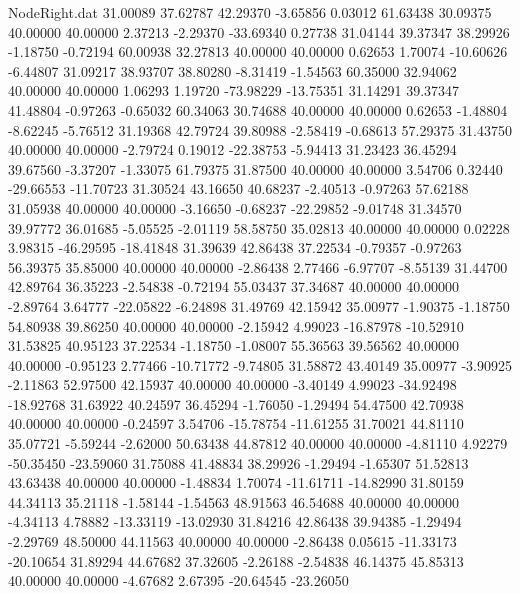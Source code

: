 \begin{filecontents}{NodeRight.dat}
  31.00089   37.62787   42.29370    -3.65856    0.03012   61.63438   30.09375   40.00000   40.00000    2.37213   -2.29370  -33.69340    0.27738
  31.04144   39.37347   38.29926    -1.18750   -0.72194   60.00938   32.27813   40.00000   40.00000    0.62653    1.70074  -10.60626   -6.44807
  31.09217   38.93707   38.80280    -8.31419   -1.54563   60.35000   32.94062   40.00000   40.00000    1.06293    1.19720  -73.98229  -13.75351
  31.14291   39.37347   41.48804    -0.97263   -0.65032   60.34063   30.74688   40.00000   40.00000    0.62653   -1.48804   -8.62245   -5.76512
  31.19368   42.79724   39.80988    -2.58419   -0.68613   57.29375   31.43750   40.00000   40.00000   -2.79724    0.19012  -22.38753   -5.94413
  31.23423   36.45294   39.67560    -3.37207   -1.33075   61.79375   31.87500   40.00000   40.00000    3.54706    0.32440  -29.66553  -11.70723
  31.30524   43.16650   40.68237    -2.40513   -0.97263   57.62188   31.05938   40.00000   40.00000   -3.16650   -0.68237  -22.29852   -9.01748
  31.34570   39.97772   36.01685    -5.05525   -2.01119   58.58750   35.02813   40.00000   40.00000    0.02228    3.98315  -46.29595  -18.41848
  31.39639   42.86438   37.22534    -0.79357   -0.97263   56.39375   35.85000   40.00000   40.00000   -2.86438    2.77466   -6.97707   -8.55139
  31.44700   42.89764   36.35223    -2.54838   -0.72194   55.03437   37.34687   40.00000   40.00000   -2.89764    3.64777  -22.05822   -6.24898
  31.49769   42.15942   35.00977    -1.90375   -1.18750   54.80938   39.86250   40.00000   40.00000   -2.15942    4.99023  -16.87978  -10.52910
  31.53825   40.95123   37.22534    -1.18750   -1.08007   55.36563   39.56562   40.00000   40.00000   -0.95123    2.77466  -10.71772   -9.74805
  31.58872   43.40149   35.00977    -3.90925   -2.11863   52.97500   42.15937   40.00000   40.00000   -3.40149    4.99023  -34.92498  -18.92768
  31.63922   40.24597   36.45294    -1.76050   -1.29494   54.47500   42.70938   40.00000   40.00000   -0.24597    3.54706  -15.78754  -11.61255
  31.70021   44.81110   35.07721    -5.59244   -2.62000   50.63438   44.87812   40.00000   40.00000   -4.81110    4.92279  -50.35450  -23.59060
  31.75088   41.48834   38.29926    -1.29494   -1.65307   51.52813   43.63438   40.00000   40.00000   -1.48834    1.70074  -11.61711  -14.82990
  31.80159   44.34113   35.21118    -1.58144   -1.54563   48.91563   46.54688   40.00000   40.00000   -4.34113    4.78882  -13.33119  -13.02930
  31.84216   42.86438   39.94385    -1.29494   -2.29769   48.50000   44.11563   40.00000   40.00000   -2.86438    0.05615  -11.33173  -20.10654
  31.89294   44.67682   37.32605    -2.26188   -2.54838   46.14375   45.85313   40.00000   40.00000   -4.67682    2.67395  -20.64545  -23.26050

\end{filecontents}
